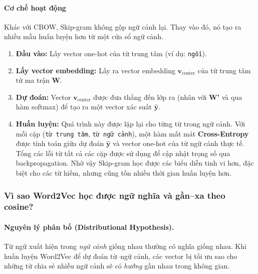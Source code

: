 \paragraph{Cơ chế hoạt động}
Khác với CBOW, Skip-gram không gộp ngữ cảnh lại. Thay vào đó, nó tạo ra nhiều mẫu huấn luyện hơn từ một cửa sổ ngữ cảnh.
\begin{enumerate}
    \item \textbf{Đầu vào:} Lấy vector one-hot của từ trung tâm (ví dụ: \texttt{ngồi}).
    \item \textbf{Lấy vector embedding:} Lấy ra vector embedding $\mathbf{v}_{\text{center}}$ của từ trung tâm từ ma trận \textbf{W}.
    \item \textbf{Dự đoán:} Vector $\mathbf{v}_{\text{center}}$ được đưa thẳng đến lớp ra (nhân với \textbf{W'} và qua hàm softmax) để tạo ra một vector xác suất $\hat{\mathbf{y}}$.
    \item \textbf{Huấn luyện:} Quá trình này được lặp lại cho từng từ trong ngữ cảnh. Với mỗi cặp (\texttt{từ trung tâm}, \texttt{từ ngữ cảnh}), một hàm mất mát \textbf{Cross-Entropy} được tính toán giữa dự đoán $\hat{\mathbf{y}}$ và vector one-hot của từ ngữ cảnh thực tế. Tổng các lỗi từ tất cả các cặp được sử dụng để cập nhật trọng số qua backpropagation. Nhờ vậy Skip-gram học được các biểu diễn tinh vi hơn, đặc biệt cho các từ hiếm, nhưng cũng tốn nhiều thời gian huấn luyện hơn.
\end{enumerate}

\begin{center}
    \label{fig:cbow_skipgram_diagram}
\end{center}

\subsubsection{Vì sao Word2Vec học được ngữ nghĩa và gần--xa theo cosine?}
\label{sssec:w2v_why_semantics}

\paragraph{Nguyên lý phân bố (Distributional Hypothesis).}
Từ ngữ xuất hiện trong \emph{ngữ cảnh} giống nhau thường có nghĩa giống nhau. Khi huấn luyện Word2Vec để dự đoán từ--ngữ cảnh, các vector bị tối ưu sao cho những từ chia sẻ nhiều ngữ cảnh sẽ có \emph{hướng} gần nhau trong không gian.

